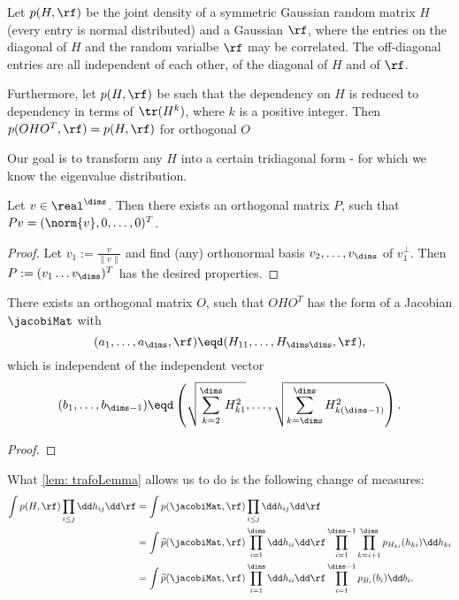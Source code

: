 Let $p(H, \rf)$ be the joint density of a symmetric Gaussian random matrix $H$ (every entry is normal distributed) and a Gaussian $\rf$, where the entries on the diagonal of $H$ and the random varialbe $\rf$ may be correlated. The off-diagonal entries are all independent of each other, of the diagonal of $H$ and of $\rf$.

Furthermore, let $p(H,\rf)$ be such that the dependency on $H$ is reduced to dependency in terms of $\tr(H^k)$, where $k$ is a positive integer. Then $p(OHO^T, \rf) = p(H,\rf)$ for orthogonal $O$ 

Our goal is to transform any $H$ into a certain tridiagonal form - for which we know the eigenvalue distribution.

\begin{lemma}
    Let $v \in \real^\dims$. Then there exists an orthogonal matrix $P$, such that $Pv = (\norm{v}, 0, \ldots, 0)^T$.
\end{lemma}
\begin{proof}
    Let \(v_1:= \frac{v}{\|v\|}\) and find (any) orthonormal basis
    \(v_2,\dots,v_\dims\) of \(v_1^\perp\). Then \(P:=(v_1\dots
    v_\dims)^T\) has the desired properties. 
\end{proof}

\begin{lemma}\label{lem: trafoLemma}
    There exists an orthogonal matrix $O$, such that $OHO^T$ has the form of a Jacobian $\jacobiMat$ with 
    $$(a_1, \ldots, a_\dims, \rf) \eqd (H_{11}, \ldots, H_{\dims \dims}, \rf),$$ which is independent of the independent vector 
    $$(b_1, \ldots, b_{\dims-1}) \eqd \left( \sqrt{\sum_{k=2}^{\dims} H_{k 1}^2}, \ldots, \sqrt{\sum_{k=\dims}^{\dims} H_{k (\dims-1)}^2} \right).$$
\end{lemma}
\begin{proof}
\end{proof}

What \ref{lem: trafoLemma} allows us to do is the following change of measures:
\begin{equation}\label{eq: trafoEquation}
    \begin{split}
        \int p(H,\rf) \prod_{i\leq j} \dd h_{ij} \dd \rf
        & = \int p(\jacobiMat, \rf) \prod_{i\leq j} \dd h_{ij} \dd \rf \\
        & = \int \widetilde{p}(\jacobiMat, \rf) 
        \prod_{i=1}^\dims \dd h_{i i} \dd \rf 
        \prod_{i=1}^{\dims-1} \prod_{k=i+1}^{\dims} p_{H_{k i}}(h_{k i}) \dd h_{k i}\\
        & = \int \widetilde{p}(\jacobiMat, \rf) 
        \prod_{i=1}^\dims \dd h_{i i} \dd \rf 
        \prod_{i=1}^{\dims-1} p_{B_i}(b_i) \dd b_i .
    \end{split}
\end{equation}

